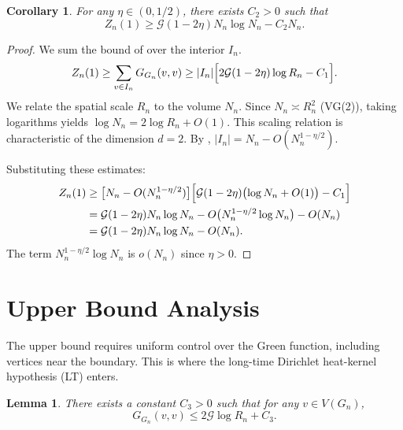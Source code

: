 \documentclass[reqno]{amsart}
\numberwithin{equation}{section}
\newtheorem{lemma}[lemma]{Lemma}
\newtheorem{corollary}[corollary]{Corollary}
\theoremstyle{definition}
\theoremstyle{remark}
\newcommand{\cG}{\mathcal{G}}
\begin{document}
\begin{corollary}\label{cor:lower}
For any $\eta \in (0,1/2)$, there exists $C_2 > 0$ such that
\[
Z_n(1) \geq \cG(1-2\eta) N_n \log N_n - C_2 N_n.
\]
\end{corollary}

\begin{proof}
We sum the bound of  over the interior $I_n$.
\[
Z_n(1) \geq \sum_{v \in I_n} G_{G_n}(v,v) \geq |I_n|\Bigl[2\cG(1-2\eta)\log R_n - C_1\Bigr].
\]
We relate the spatial scale $R_n$ to the volume $N_n$. Since $N_n \asymp R_n^2$ (VG(2)), taking logarithms yields $\log N_n = 2\log R_n + O(1)$. This scaling relation is characteristic of the dimension $d=2$. By , $|I_n| = N_n - O(N_n^{1-\eta/2})$.

Substituting these estimates:
\begin{align*}
Z_n(1) &\geq \bigl[N_n - O(N_n^{1-\eta/2})\bigr]
          \Bigl[\cG(1-2\eta)\bigl(\log N_n + O(1)\bigr) - C_1\Bigr] \\
&= \cG(1-2\eta) N_n \log N_n - O\bigl(N_n^{1-\eta/2}\log N_n\bigr) - O(N_n) \\
&= \cG(1-2\eta) N_n \log N_n - O(N_n).\qedhere
\end{align*}
The term $N_n^{1-\eta/2}\log N_n$ is $o(N_n)$ since $\eta>0$.
\end{proof}

\section{Upper Bound Analysis}\label{sec:upper_bound}

The upper bound requires uniform control over the Green function, including vertices near the boundary. This is where the long-time Dirichlet heat-kernel hypothesis (LT) enters.

\begin{lemma}\label{lem:upper}
There exists a constant $C_3 > 0$ such that for any $v \in V(G_n)$,
\[
G_{G_n}(v,v) \leq 2\cG \log R_n + C_3.
\]
\end{lemma}
\end{document}
